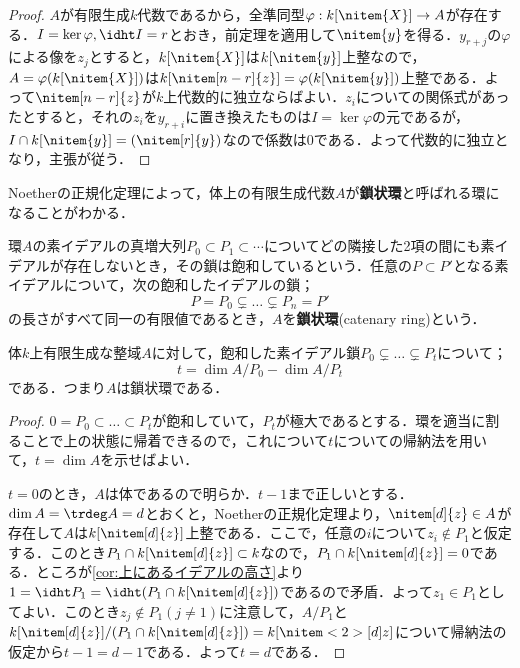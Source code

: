\begin{proof}
	$A$が有限生成$k$代数であるから，全準同型$\varphi:k[\nitem{X}]\to A$が存在する．$I=\ker\varphi, \idht I=r$とおき，前定理を適用して$\nitem{y}$を得る．$y_{r+j}$の$\varphi$による像を$z_j$とすると，$k[\nitem{X}]$は$k[\nitem{y}]$上整なので，$A=\varphi(k[\nitem{X}])$は$k[\nitem[n-r]{z}]=\varphi(k[\nitem{y}])$上整である．よって$\nitem[n-r]{z}$が$k$上代数的に独立ならばよい．$z_i$についての関係式があったとすると，それの$z_i$を$y_{r+i}$に置き換えたものは$I=\ker\varphi$の元であるが，$I\cap k[\nitem{y}]=(\nitem[r]{y})$なので係数は0である．よって代数的に独立となり，主張が従う．
\end{proof}

Noetherの正規化定理によって，体上の有限生成代数$A$が\textbf{鎖状環}と呼ばれる環になることがわかる．
\begin{defi}[鎖状環]
	環$A$の素イデアルの真増大列$P_0\subset P_1\subset\cdots$についてどの隣接した2項の間にも素イデアルが存在しないとき，その鎖は飽和しているという．任意の$P\subset P'$となる素イデアルについて，次の飽和したイデアルの鎖；
	\[P=P_0\subsetneq\dots\subsetneq P_n= P'\]
	の長さがすべて同一の有限値であるとき，$A$を\textbf{鎖状環}(catenary ring)という．
\end{defi}

\begin{thm}\label{thm:体上有限生成整域は鎖状環}
	体$k$上有限生成な整域$A$に対して，飽和した素イデアル鎖$P_0\subsetneq\dots\subsetneq P_t$について；
	\[t=\dim A/P_0-\dim A/P_t\]
	である．つまり$A$は鎖状環である．
\end{thm}

\begin{proof}
	$0=P_0\subset\dots\subset P_t$が飽和していて，$P_t$が極大であるとする．環を適当に割ることで上の状態に帰着できるので，これについて$t$についての帰納法を用いて，$t=\dim A$を示せばよい．
		
	$t=0$のとき，$A$は体であるので明らか．$t-1$まで正しいとする．$\dim A=\trdeg A=d$とおくと，Noetherの正規化定理より，$\nitem[d]{z}\in A$が存在して$A$は$k[\nitem[d]{z}]$上整である．ここで，任意の$i$について$z_i\not\in P_1$と仮定する．このとき$P_1\cap k[\nitem[d]{z}]\subset k$なので，$P_1\cap k[\nitem[d]{z}]=0$である．ところが\ref{cor:上にあるイデアルの高さ}より$1=\idht P_1=\idht (P_1\cap k[\nitem[d]{z}])$であるので矛盾．よって$z_1\in P_1$としてよい．このとき$z_j\not\in P_1 (j\neq1)$に注意して，$A/P_1$と$k[\nitem[d]{z}]/(P_1\cap k[\nitem[d]{z}])=k[\nitem<2>[d]{z}]$について帰納法の仮定から$t-1=d-1$である．よって$t=d$である．
\end{proof}

